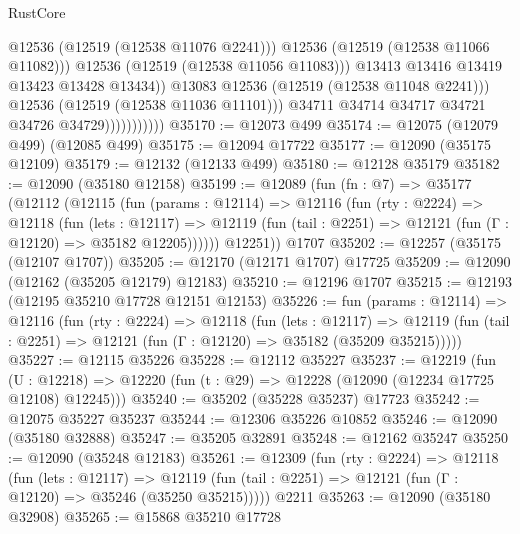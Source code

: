 \begin{lexlean}{RustCore}
\begin{coremodule}
                                        @12536
                                        (@12519 (@12538 @11076 @2241)))
                                      @12536
                                      (@12519 (@12538 @11066 @11082)))
                                    @12536
                                    (@12519 (@12538 @11056 @11083)))
                                  @13413
                                  @13416
                                  @13419
                                  @13423
                                  @13428
                                  @13434))
                              @13083
                              @12536
                              (@12519 (@12538 @11048 @2241)))
                            @12536
                            (@12519 (@12538 @11036 @11101)))
                          @34711
                          @34714
                          @34717
                          @34721
                          @34726
                          @34729)))))))))))
@35170 := @12073 @499
@35174 := @12075 (@12079 @499) (@12085 @499)
@35175 := @12094 @17722
@35177 := @12090 (@35175 @12109)
@35179 := @12132 (@12133 @499)
@35180 := @12128 @35179
@35182 := @12090 (@35180 @12158)
@35199 := @12089
    (fun (fn : @7) =>
    @35177
      (@12112
        (@12115
          (fun (params : @12114) =>
          @12116
            (fun (rty : @2224) =>
            @12118
              (fun (lets : @12117) =>
              @12119 (fun (tail : @2251) => @12121 (fun (Γ : @12120) => @35182 @12205))))))
        @12251))
    @1707
@35202 := @12257 (@35175 (@12107 @1707))
@35205 := @12170 (@12171 @1707) @17725
@35209 := @12090 (@12162 (@35205 @12179) @12183)
@35210 := @12196 @1707
@35215 := @12193 (@12195 @35210 @17728 @12151 @12153)
@35226 := fun (params : @12114) =>
  @12116
    (fun (rty : @2224) =>
    @12118
      (fun (lets : @12117) =>
      @12119 (fun (tail : @2251) => @12121 (fun (Γ : @12120) => @35182 (@35209 @35215)))))
@35227 := @12115 @35226
@35228 := @12112 @35227
@35237 := @12219
    (fun (U : @12218) => @12220 (fun (t : @29) => @12228 (@12090 (@12234 @17725 @12108) @12245)))
@35240 := @35202 (@35228 @35237) @17723
@35242 := @12075 @35227 @35237
@35244 := @12306 @35226 @10852
@35246 := @12090 (@35180 @32888)
@35247 := @35205 @32891
@35248 := @12162 @35247
@35250 := @12090 (@35248 @12183)
@35261 := @12309
    (fun (rty : @2224) =>
    @12118
      (fun (lets : @12117) =>
      @12119 (fun (tail : @2251) => @12121 (fun (Γ : @12120) => @35246 (@35250 @35215)))))
    @2211
@35263 := @12090 (@35180 @32908)
@35265 := @15868 @35210 @17728

\end{coremodule}
\end{lexlean}
